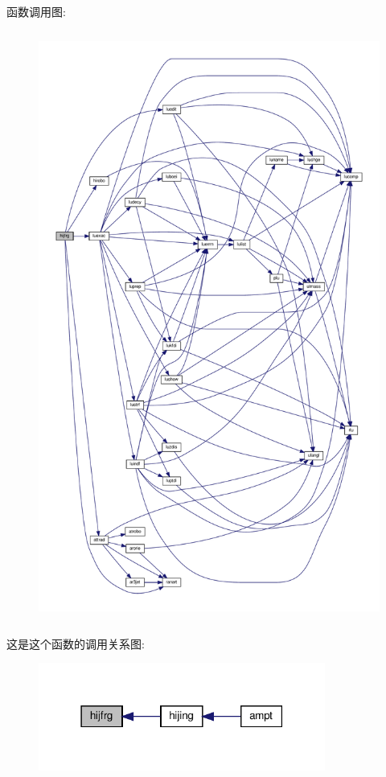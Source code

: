 函数调用图\+:
\nopagebreak
\begin{figure}[H]
\begin{center}
\leavevmode
\includegraphics[height=550pt]{hijfrg_8f90_a7465486594ae3fa0b96020635449d731_cgraph}
\end{center}
\end{figure}
这是这个函数的调用关系图\+:
\nopagebreak
\begin{figure}[H]
\begin{center}
\leavevmode
\includegraphics[width=267pt]{hijfrg_8f90_a7465486594ae3fa0b96020635449d731_icgraph}
\end{center}
\end{figure}
